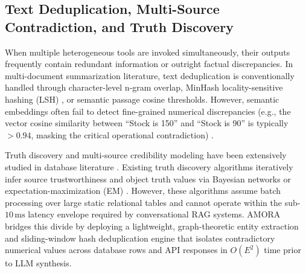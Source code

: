 \documentclass[conference,onecolumn,10pt]{IEEEtran}
\begin{document}
\subsection{Text Deduplication, Multi-Source Contradiction, and Truth Discovery}
When multiple heterogeneous tools are invoked simultaneously, their outputs frequently contain redundant information or outright factual discrepancies. In multi-document summarization literature, text deduplication is conventionally handled through character-level n-gram overlap, MinHash locality-sensitive hashing (LSH) \cite{broder1997minhash}, or semantic passage cosine thresholds. However, semantic embeddings often fail to detect fine-grained numerical discrepancies (e.g., the vector cosine similarity between ``Stock is 150'' and ``Stock is 90'' is typically $>0.94$, masking the critical operational contradiction) \cite{min2023factscore}.

Truth discovery and multi-source credibility modeling have been extensively studied in database literature \cite{li2014resolving,zheng2017truth}. Existing truth discovery algorithms iteratively infer source trustworthiness and object truth values via Bayesian networks or expectation-maximization (EM) \cite{dawid1979maximum}. However, these algorithms assume batch processing over large static relational tables and cannot operate within the sub-$10\,\text{ms}$ latency envelope required by conversational RAG systems. AMORA bridges this divide by deploying a lightweight, graph-theoretic entity extraction and sliding-window hash deduplication engine that isolates contradictory numerical values across database rows and API responses in $O(E^2)$ time prior to LLM synthesis.
\end{document}
